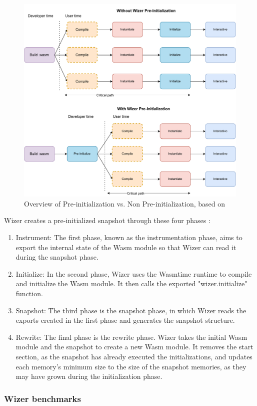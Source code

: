 \begin{figure}[H]
	\centering
	\includegraphics[width=0.8\linewidth]{images/runtimes/Wizer.drawio.pdf}
	\caption{Overview of Pre-initialization vs. Non Pre-initialization, based on \cite{fitzgerald_2021_hit}}
	\label{fig:wizer}
\end{figure}

Wizer creates a pre-initialized snapshot through these four phases \cite{fitzgerald_2021_hit}:
\begin{enumerate}
	\item Instrument: The first phase, known as the instrumentation phase, aims to export the internal state of the Wasm module so that Wizer can read it during the snapshot phase.
	\item Initialize: In the second phase, Wizer uses the Wasmtime runtime to compile and initialize the Wasm module. It then calls the exported "wizer.initialize" function.
	\item Snapshot: The third phase is the snapshot phase, in which Wizer reads the exports created in the first phase and generates the snapshot structure.
	\item Rewrite: The final phase is the rewrite phase. Wizer takes the initial Wasm module and the snapshot to create a new Wasm module. It removes the start section, as the snapshot has already executed the initializations, and updates each memory's minimum size to the size of the snapshot memories, as they may have grown during the initialization phase.
\end{enumerate}


\subsubsection{Wizer benchmarks}
\label{sec:wizer-benchmarks}

